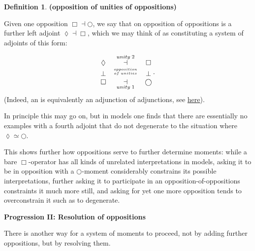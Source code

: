 \documentclass[12pt,titlepage]{article}
\newcommand{\itexarray}[1]{\begin{matrix}#1\end{matrix}}
\theoremstyle{plain}
\theoremstyle{definition}
\newtheorem{defn}{Definition}
\theoremstyle{remark}
\begin{document}
\begin{defn}
\label{HigherOrderOpposition}\hypertarget{HigherOrderOpposition}{}
\textbf{(opposition of unities of oppositions)}

Given one opposition $\Box \dashv \bigcirc$, we say that on opposition of oppositions is a further left adjoint $\lozenge \dashv \Box$, which we may think of as constituting a system of adjoints of this form:

\begin{displaymath}
\itexarray{
    \lozenge &\overset{unity\;2}{\dashv}& \Box
    \\
    \bot &\stackrel{opposition \atop {of\;unities}}{}& \bot
    \\
    \Box &\underset{unity\;1}{\dashv}& \bigcirc
  }
  \,.
\end{displaymath}
(Indeed, an  is equivalently an adjunction of adjunctions, see \href{http://ncatlab.org/nlab/show/adjoint+triple#AsAdjunctionOfAdjunctions}{here}).

\end{defn}
In principle this may go on, but in models one finds that there are essentially no examples with a fourth adjoint that do not degenerate to the  situation where $\lozenge \simeq \bigcirc$.

This shows further how oppositions serve to further determine moments: while a bare $\Box$-operator has all kinds of unrelated interpretations in models, asking it to be in opposition with a $\bigcirc$-moment considerably constrains its possible interpretations, further asking it to participate in an opposition-of-oppositions constraints it much more still, and asking for yet one more opposition tends to overconstrain it such as to degenerate.

\textbf{Progression II: Resolution of oppositions}

There is another way for a system of moments to proceed, not by adding further oppositions, but by resolving them.
\end{document}
